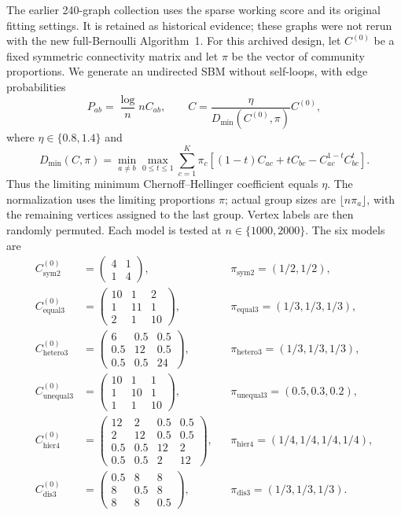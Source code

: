 The earlier 240-graph collection uses the sparse working score and its original fitting settings. It is retained as historical evidence; these graphs were not rerun with the new full-Bernoulli Algorithm~1. For this archived design, let $C^{(0)}$ be a fixed symmetric connectivity matrix and
let $\pi$ be the vector of community proportions. We generate an undirected
SBM without self-loops, with edge probabilities
\begin{equation}
  P_{ab}=\frac\log n{n}C_{ab},\qquad
  C=\frac{\eta}{D_{\min}(C^{(0)},\pi)}C^{(0)},
  \label{eq:experiment_normalization}
\end{equation}
where $\eta\in\{0.8,1.4\}$ and
\begin{equation}
 D_{\min}(C,\pi)=\min_{a\ne b}\max_{0\le t\le1}
  \sum_{c=1}^K\pi_c\left[(1-t)C_{ac}+tC_{bc}
                          -C_{ac}^{1-t}C_{bc}^t\right].
\end{equation}
Thus the limiting minimum Chernoff--Hellinger coefficient equals $\eta$.
The normalization uses the limiting proportions $\pi$; actual group sizes
are $\lfloor n\pi_a\rfloor$, with the remaining vertices assigned to the
last group. Vertex labels are then randomly permuted. Each model is tested
at $n\in\{1000,2000\}$. The six models are
\begin{align*}
 C^{(0)}_{\mathrm{sym2}}&=
 \begin{pmatrix}4&1\\1&4\end{pmatrix},
 &&\pi_{\mathrm{sym2}}=(1/2,1/2),\\[2mm]
 C^{(0)}_{\mathrm{equal3}}&=
 \begin{pmatrix}10&1&2\\1&11&1\\2&1&10\end{pmatrix},
 &&\pi_{\mathrm{equal3}}=(1/3,1/3,1/3),\\[2mm]
 C^{(0)}_{\mathrm{hetero3}}&=
 \begin{pmatrix}6&0.5&0.5\\0.5&12&0.5\\0.5&0.5&24\end{pmatrix},
 &&\pi_{\mathrm{hetero3}}=(1/3,1/3,1/3),\\[2mm]
 C^{(0)}_{\mathrm{unequal3}}&=
 \begin{pmatrix}10&1&1\\1&10&1\\1&1&10\end{pmatrix},
 &&\pi_{\mathrm{unequal3}}=(0.5,0.3,0.2),\\[2mm]
 C^{(0)}_{\mathrm{hier4}}&=
 \begin{pmatrix}12&2&0.5&0.5\\2&12&0.5&0.5\\
                 0.5&0.5&12&2\\0.5&0.5&2&12\end{pmatrix},
 &&\pi_{\mathrm{hier4}}=(1/4,1/4,1/4,1/4),\\[2mm]
 C^{(0)}_{\mathrm{dis3}}&=
 \begin{pmatrix}0.5&8&8\\8&0.5&8\\8&8&0.5\end{pmatrix},
 &&\pi_{\mathrm{dis3}}=(1/3,1/3,1/3).
\end{align*}
